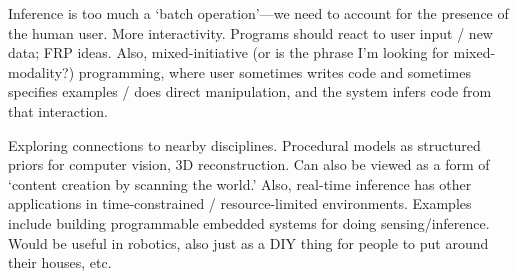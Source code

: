 \documentclass[
10pt, %
a4paper, %
oneside, %
headinclude,footinclude, %
BCOR5mm, %
]{scrartcl}
\begin{document}
Inference is too much a `batch operation'---we need to account for the presence of the human user. More interactivity. Programs should react to user input / new data; FRP ideas. Also, mixed-initiative (or is the phrase I'm looking for mixed-modality?) programming, where user sometimes writes code and sometimes specifies examples / does direct manipulation, and the system infers code from that interaction.

Exploring connections to nearby disciplines. Procedural models as structured priors for computer vision, 3D reconstruction. Can also be viewed as a form of `content creation by scanning the world.' Also, real-time inference has other applications in time-constrained / resource-limited environments. Examples include building programmable embedded systems for doing sensing/inference. Would be useful in robotics, also just as a DIY thing for people to put around their houses, etc.




\end{document}
